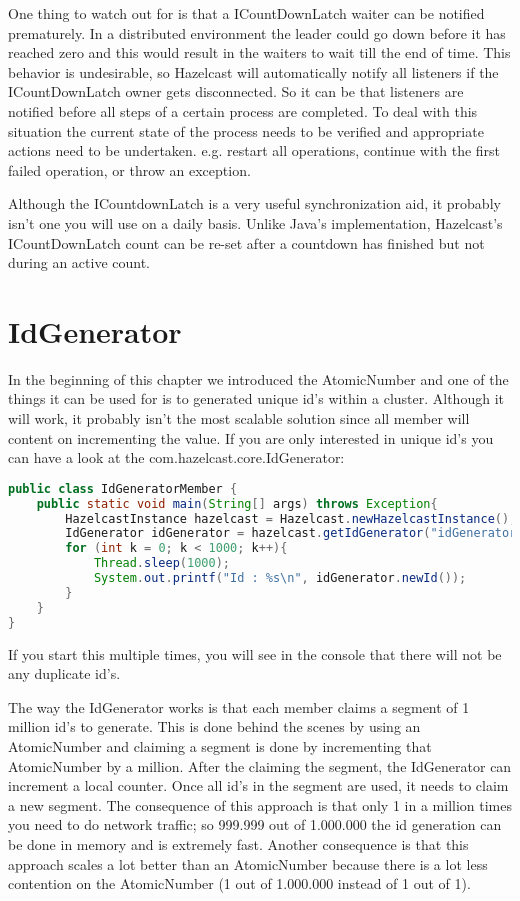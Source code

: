 One thing to watch out for is that a ICountDownLatch waiter can be notified prematurely. In a distributed environment the leader could go down before it has reached zero and this would result in the waiters to wait till the end of time. This behavior is undesirable, so Hazelcast will automatically notify all listeners if the ICountDownLatch owner gets disconnected. So it can be that listeners are notified before all steps of a certain process are completed. To deal with this situation the current state of the process needs to be verified and appropriate actions need to be undertaken. e.g. restart all operations, continue with the first failed operation, or throw an exception.

Although the ICountdownLatch is a very useful synchronization aid, it probably isn't one you will use on a daily basis. Unlike Java's implementation, Hazelcast's ICountDownLatch count can be re-set after a countdown has finished but not during an active count. 

\section{IdGenerator}
In the beginning of this chapter we introduced the AtomicNumber and one of the things it can be used for is to generated unique id's within a cluster. Although it will work, it probably isn't the most scalable solution since all member will content on incrementing the value. If you are only interested in unique id's you can have a look at the com.hazelcast.core.IdGenerator:
\begin{lstlisting}[language=java]
public class IdGeneratorMember {
    public static void main(String[] args) throws Exception{
        HazelcastInstance hazelcast = Hazelcast.newHazelcastInstance();
        IdGenerator idGenerator = hazelcast.getIdGenerator("idGenerator");
        for (int k = 0; k < 1000; k++){
            Thread.sleep(1000);
            System.out.printf("Id : %s\n", idGenerator.newId());
        }
    }
}
\end{lstlisting}
If you start this multiple times, you will see in the console that there will not be any duplicate id's.

The way the IdGenerator works is that each member claims a segment of 1 million id's to generate. This is done behind the scenes by using an AtomicNumber and claiming a segment is done by incrementing that AtomicNumber by a million. After the claiming the segment, the IdGenerator can increment a local counter. Once all id's in the segment are used, it needs to claim a new segment. The consequence of this approach is that only 1 in a million times you need to do network traffic; so 999.999 out of 1.000.000 the id generation can be done in memory and is extremely fast. Another consequence is that this approach scales a lot better than an AtomicNumber because there is a lot less contention on the AtomicNumber (1 out of 1.000.000 instead of 1 out of 1).

